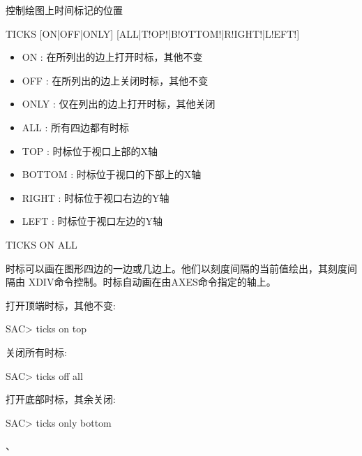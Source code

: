 \label{cmd:ticks}

控制绘图上时间标记的位置

\begin{SACSTX}
TICKS [ON|OFF|ONLY] [ALL|T!OP!|B!OTTOM!|R!IGHT!|L!EFT!]
\end{SACSTX}

\begin{itemize}
\item ON : 在所列出的边上打开时标，其他不变 
\item OFF : 在所列出的边上关闭时标，其他不变 
\item ONLY : 仅在列出的边上打开时标，其他关闭 
\item ALL : 所有四边都有时标 
\item TOP : 时标位于视口上部的X轴 
\item BOTTOM : 时标位于视口的下部上的X轴 
\item RIGHT : 时标位于视口右边的Y轴 
\item LEFT : 时标位于视口左边的Y轴 
\end{itemize}

\begin{SACDFT}
TICKS ON ALL
\end{SACDFT}

时标可以画在图形四边的一边或几边上。他们以刻度间隔的当前值绘出，其刻度间隔由	XDIV命令控制。时标自动画在由AXES命令指定的轴上。

打开顶端时标，其他不变:
\begin{SACCode}
SAC> ticks on top
\end{SACCode}

关闭所有时标:
\begin{SACCode}
SAC> ticks off all
\end{SACCode}

打开底部时标，其余关闭:
\begin{SACCode}
SAC> ticks only bottom
\end{SACCode}

、
